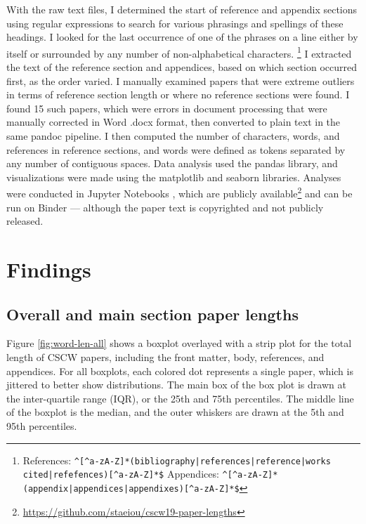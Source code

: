 \documentclass[format=acmsmall, screen=true]{acmart}
\begin{document}
With the raw text files, I determined the start of reference and appendix sections using regular expressions to search for various phrasings and spellings of these headings. I looked for the last occurrence of one of the phrases on a line either by itself or surrounded by any number of non-alphabetical characters. \footnote{References: \texttt{\textasciicircum{}[\textasciicircum{}a-zA-Z]*(bibliography|references|reference|works cited|refefences)[\textasciicircum{}a-zA-Z]*\$} \newline
Appendices: \texttt{\textasciicircum{}[\textasciicircum{}a-zA-Z]*(appendix|appendices|appendixes)[\textasciicircum{}a-zA-Z]*\$} } I extracted the text of the reference section and appendices, based on which section occurred first, as the order varied. I manually examined papers that were extreme outliers in terms of reference section length or where no reference sections were found. I found 15 such papers, which were errors in document processing that were manually corrected in Word .docx format, then converted to plain text in the same pandoc pipeline. I then computed the number of characters, words, and references in reference sections, and words were defined as tokens separated by any number of contiguous spaces. Data analysis used the pandas \cite{pandas} library, and visualizations were made using the matplotlib \cite{matplotlib} and seaborn \cite{seaborn} libraries. Analyses were conducted in Jupyter Notebooks \cite{jupyter}, which are publicly available\footnote{\url{https://github.com/staeiou/cscw19-paper-lengths}} and can be run on Binder \cite{binder} --- although the paper text is copyrighted and not publicly released.

\section{Findings}

\subsection{Overall and main section paper lengths}

Figure \ref{fig:word-len-all} shows a boxplot overlayed with a strip plot for the total length of CSCW papers, including the front matter, body, references, and appendices. For all boxplots, each colored dot represents a single paper, which is jittered to better show distributions. The main box of the box plot is drawn at the inter-quartile range (IQR), or the 25th and 75th percentiles. The middle line of the boxplot is the median, and the outer whiskers are drawn at the 5th and 95th percentiles. 
\end{document}
